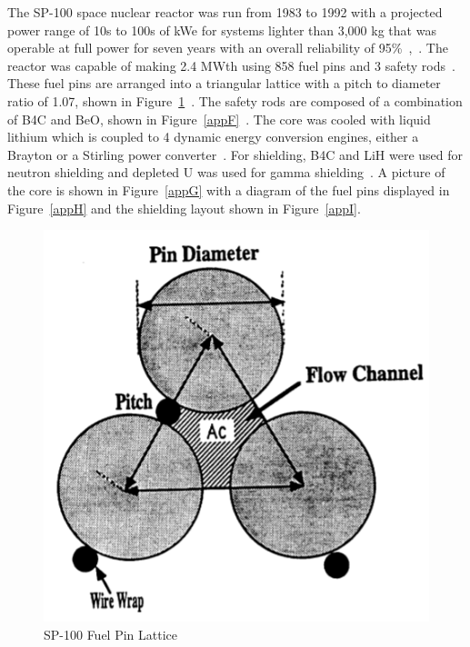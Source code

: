 \documentclass{article}
\begin{document}
    The SP-100 space nuclear reactor was run from 1983 to 1992 with a projected power range of 10s to 100s of kWe for systems lighter than 3,000 kg that was operable at full power for seven years with an overall reliability of 95\%~\cite{borgesprimary},~\cite{anderson1983power}. The reactor was capable of making 2.4 MWth using 858 fuel pins and 3 safety rods~\cite{demuth2003sp100}. These fuel pins are arranged into a triangular lattice with a pitch to diameter ratio of 1.07, shown in Figure~\ref{appE}~\cite{el1992decay}. The safety rods are composed of a combination of B4C and BeO, shown in Figure~\ref{appF}~\cite{demuth2003sp100}. The core was cooled with liquid lithium which is coupled to 4 dynamic energy conversion engines, either a Brayton or a Stirling power converter~\cite{el1992decay}. For shielding, B4C and LiH were used for neutron shielding and depleted U was used for gamma shielding~\cite{demuth2003sp100}. A picture of the core is shown in Figure~\ref{appG} with a diagram of the fuel pins displayed in Figure~\ref{appH} and the shielding layout shown in Figure~\ref{appI}.


\begin{figure}[]
	\centering
	\includegraphics[height=0.45\textheight]{fig/appE}
	\caption[SP-100 Fuel Pin Lattice]{SP-100 Fuel Pin Lattice~\cite{el1992decay}}
	\label{appE}
\end{figure}
\end{document}
